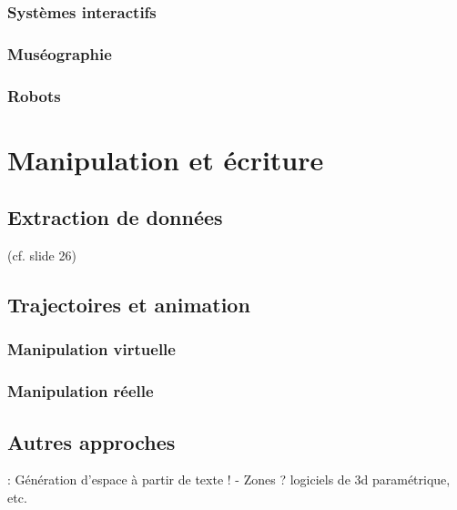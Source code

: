 \documentclass[french,12pt]{article}
\begin{document}
\subsubsection{Systèmes interactifs}
\cite{chalon_realite_2004}
\cite{jankowski_advances_2015}
\cite{shen_blowbrush:_2014}
\cite{gustafson_imaginary_2010}
\subsubsection{Muséographie}
\cite{adhitya_composing_2012}
\cite{michael_comparative_2010}
\cite{azough_modeet_2014}
\cite{kidd_multi-touch_2011}
\subsubsection{Robots}
\cite{lee_virtual_2014} %

\section{Manipulation et écriture}

\subsection{Extraction de données}
\cite{li_aesthetic_2009} (cf. slide 26)
\subsection{Trajectoires et animation}
\cite{santosa_direct_2013}
\cite{kazi_kitty:_2014,scott_physink:_2013}

\cite{garcia_jeremie_processing_2015,garcia_towards_2015}
\cite{wakefield_cosm:_2011}
\cite{wagner_introducing_2014}
\cite{melchior_authoring_2005} 
\cite{bresson_spatial_2012}
\cite{wozniewski_spatosc:_2012}
\cite{favory_trajectoires:_2015}
\cite{casas_4d_2013}


\subsubsection{Manipulation virtuelle}
\cite{jacob_design_2014} %
\cite{cohen_interface_1999}
\subsubsection{Manipulation réelle}
\cite{grossman_interface_2003}


\subsection{Autres approches}
\cite{andriamarozakaniaina_du_2012} : Génération d'espace à partir de texte !
\cite{van_nort_lom_2006}
 - Zones ? logiciels de 3d paramétrique, etc.
\end{document}
